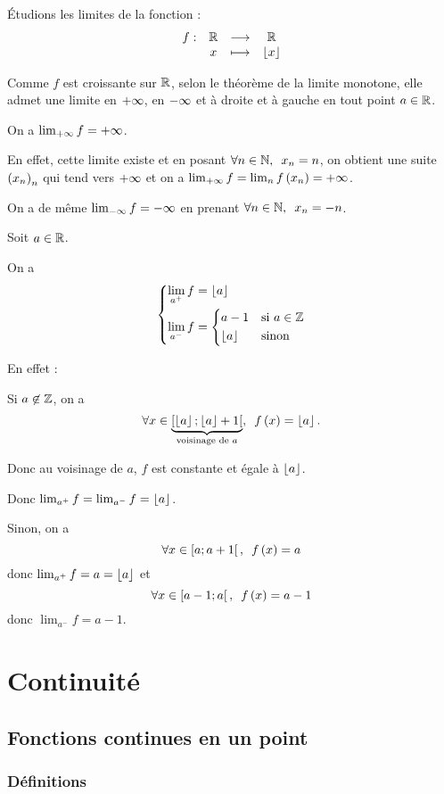 \begin{ex}
Étudions les limites de la fonction  : \[\begin{array}[t]{cccc}f : & \mathbb{R} & \longrightarrow & \mathbb{R} \\ & x & \longmapsto & \left\lfloor x\right\rfloor\end{array}\]

Comme \(f\) est croissante sur \(\mathbb{R}\), selon le théorème de la limite monotone, elle admet une limite en \(+\infty\), en \(-\infty\) et à droite et à gauche en tout point \(a\in\mathbb{R}\).

On a \(\lim_{+\infty}f=+\infty\).

En effet, cette limite existe et en posant \(\quantifs{\forall n\in\N}x_n=n\), on obtient une suite \(\left(x_n\right)_n\) qui tend vers \(+\infty\) et on a \(\lim_{+\infty}f=\lim_nf\left(x_n\right)=+\infty\).

On a de même \(\lim_{-\infty}f=-\infty\) en prenant \(\quantifs{\forall n\in\N}x_n=-n\).

Soit \(a\in\mathbb{R}\).

On a \[\begin{dcases}\lim_{a^+}f=\left\lfloor a\right\rfloor \\ \lim_{a^-}f=\begin{dcases}a-1 &\text{si \(a\in\mathbb{Z}\)} \\ \left\lfloor a\right\rfloor &\text{sinon}\end{dcases}\end{dcases}\]

En effet :

Si \(a\not\in\mathbb{Z}\), on a \[\quantifs{\forall x\in\underbrace{\intervie{\floor{a}}{\floor{a}+1}}_{\text{voisinage de \(a\)}}}f\paren{x}=\floor{a}.\]

Donc au voisinage de \(a\), \(f\) est constante et égale à \(\left\lfloor a\right\rfloor\).

Donc \(\lim_{a^+}f=\lim_{a^-}f=\left\lfloor a\right\rfloor\).

Sinon, on a \[\quantifs{\forall x\in\intervie{a}{a+1}}f\paren{x}=a\] donc \(\lim_{a^+}f=a=\left\lfloor a\right\rfloor\) et \[\quantifs{\forall x\in\intervie{a-1}{a}}f\paren{x}=a-1\] donc \(\lim_{a^-}f=a-1\).
\end{ex}

\section{Continuité}

\subsection{Fonctions continues en un point}

\subsubsection{Définitions}

